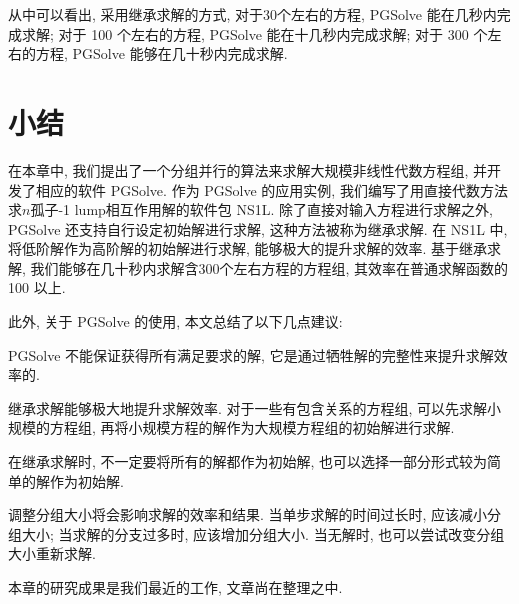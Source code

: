 从中可以看出, 采用继承求解的方式, 对于30个左右的方程, PGSolve 能在几秒内完成求解; 对于 100 个左右的方程, PGSolve 能在十几秒内完成求解; 对于 300 个左右的方程, PGSolve 能够在几十秒内完成求解. 
 

\section{小结}
在本章中, 我们提出了一个分组并行的算法来求解大规模非线性代数方程组, 并开发了相应的软件 PGSolve. 作为 PGSolve 的应用实例, 我们编写了用直接代数方法求$n$孤子-1 lump相互作用解的软件包 NS1L. 除了直接对输入方程进行求解之外, PGSolve 还支持自行设定初始解进行求解, 这种方法被称为继承求解. 在 NS1L 中, 将低阶解作为高阶解的初始解进行求解, 能够极大的提升求解的效率. 基于继承求解, 我们能够在几十秒内求解含300个左右方程的方程组, 其效率在普通求解函数的 100 以上. 

此外, 关于 PGSolve 的使用, 本文总结了以下几点建议:
\begin{compactenum}[(1)]
\item PGSolve 不能保证获得所有满足要求的解, 它是通过牺牲解的完整性来提升求解效率的.
\item 继承求解能够极大地提升求解效率. 对于一些有包含关系的方程组, 可以先求解小规模的方程组, 再将小规模方程的解作为大规模方程组的初始解进行求解. 
\item 在继承求解时, 不一定要将所有的解都作为初始解, 也可以选择一部分形式较为简单的解作为初始解.
\item 调整分组大小将会影响求解的效率和结果. 当单步求解的时间过长时, 应该减小分组大小; 当求解的分支过多时, 应该增加分组大小. 当无解时, 也可以尝试改变分组大小重新求解. 
\end{compactenum}
 
本章的研究成果是我们最近的工作, 文章尚在整理之中. 
